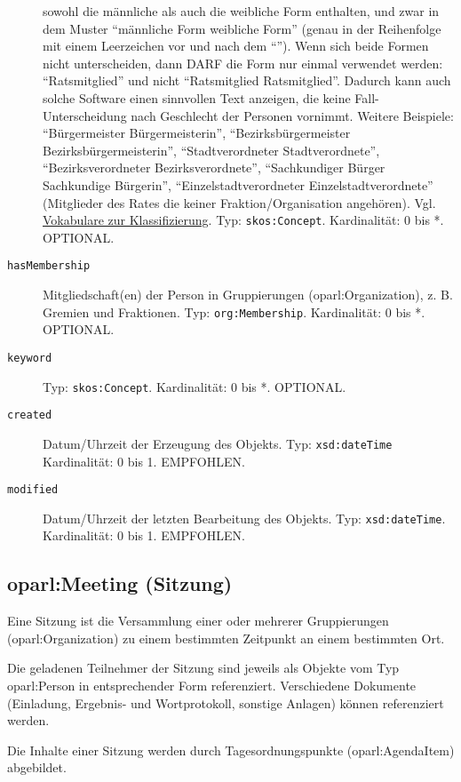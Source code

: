 \documentclass[,a4paper]{article}
\begin{document}
\begin{description}
sowohl die männliche als auch die weibliche Form enthalten, und zwar in
dem Muster ``männliche Form \textbar{} weibliche Form'' (genau in der
Reihenfolge mit einem Leerzeichen vor und nach dem ``\textbar{}''). Wenn
sich beide Formen nicht unterscheiden, dann DARF die Form nur einmal
verwendet werden: ``Ratsmitglied'' und nicht ``Ratsmitglied \textbar{}
Ratsmitglied''. Dadurch kann auch solche Software einen sinnvollen Text
anzeigen, die keine Fall-Unterscheidung nach Geschlecht der Personen
vornimmt. Weitere Beispiele: ``Bürgermeister \textbar{}
Bürgermeisterin'', ``Bezirksbürgermeister \textbar{}
Bezirksbürgermeisterin'', ``Stadtverordneter \textbar{}
Stadtverordnete'', ``Bezirksverordneter \textbar{} Bezirksverordnete'',
``Sachkundiger Bürger \textbar{} Sachkundige Bürgerin'',
``Einzelstadtverordneter \textbar{} Einzelstadtverordnete'' (Mitglieder
des Rates die keiner Fraktion/Organisation angehören). Vgl.
\hyperref[vokabulareux5fklassifizierung]{Vokabulare zur
Klassifizierung}. Typ: \texttt{skos:Concept}. Kardinalität: 0 bis *.
OPTIONAL.
\item[\texttt{hasMembership}]
Mitgliedschaft(en) der Person in Gruppierungen (oparl:Organization), z.
B. Gremien und Fraktionen. Typ: \texttt{org:Membership}. Kardinalität: 0
bis *. OPTIONAL.
\item[\texttt{keyword}]
Typ: \texttt{skos:Concept}. Kardinalität: 0 bis *. OPTIONAL.
\item[\texttt{created}]
Datum/Uhrzeit der Erzeugung des Objekts. Typ: \texttt{xsd:dateTime}
Kardinalität: 0 bis 1. EMPFOHLEN.
\item[\texttt{modified}]
Datum/Uhrzeit der letzten Bearbeitung des Objekts. Typ:
\texttt{xsd:dateTime}. Kardinalität: 0 bis 1. EMPFOHLEN.
\end{description}

\subsection{oparl:Meeting (Sitzung)}\label{oparlux5fmeeting}

Eine Sitzung ist die Versammlung einer oder mehrerer Gruppierungen
(oparl:Organization) zu einem bestimmten Zeitpunkt an einem bestimmten
Ort.

Die geladenen Teilnehmer der Sitzung sind jeweils als Objekte vom Typ
oparl:Person in entsprechender Form referenziert. Verschiedene Dokumente
(Einladung, Ergebnis- und Wortprotokoll, sonstige Anlagen) können
referenziert werden.

Die Inhalte einer Sitzung werden durch Tagesordnungspunkte
(oparl:AgendaItem) abgebildet.
\end{document}
